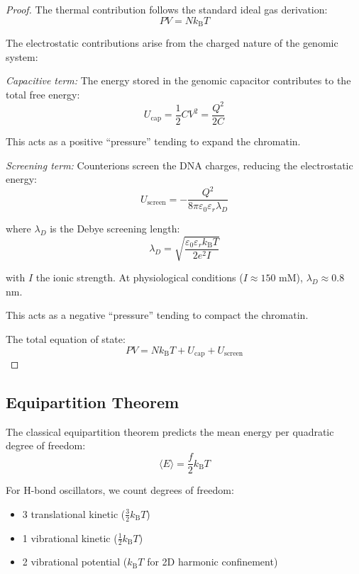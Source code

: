 \documentclass[twocolumn,10pt]{article}
\theoremstyle{remark}
\newcommand{\kB}{k_{\mathrm{B}}}
\begin{document}
\begin{proof}
The thermal contribution follows the standard ideal gas derivation:
\begin{equation}
PV = N\kB T
\end{equation}

The electrostatic contributions arise from the charged nature of the genomic system:

\textit{Capacitive term:} The energy stored in the genomic capacitor contributes to the total free energy:
\begin{equation}
U_{\mathrm{cap}} = \frac{1}{2}CV^2 = \frac{Q^2}{2C}
\end{equation}

This acts as a positive ``pressure'' tending to expand the chromatin.

\textit{Screening term:} Counterions screen the DNA charges, reducing the electrostatic energy:
\begin{equation}
U_{\mathrm{screen}} = -\frac{Q^2}{8\pi\varepsilon_0\varepsilon_r\lambda_D}
\end{equation}

where $\lambda_D$ is the Debye screening length:
\begin{equation}
\lambda_D = \sqrt{\frac{\varepsilon_0\varepsilon_r \kB T}{2e^2 I}}
\end{equation}

with $I$ the ionic strength. At physiological conditions ($I \approx 150$ mM), $\lambda_D \approx 0.8$ nm.

This acts as a negative ``pressure'' tending to compact the chromatin.

The total equation of state:
\begin{equation}
PV = N\kB T + U_{\mathrm{cap}} + U_{\mathrm{screen}}
\end{equation}
\end{proof}

\subsection{Equipartition Theorem}

The classical equipartition theorem predicts the mean energy per quadratic degree of freedom:
\begin{equation}
\langle E \rangle = \frac{f}{2}\kB T
\end{equation}

For H-bond oscillators, we count degrees of freedom:
\begin{itemize}
\item 3 translational kinetic ($\frac{3}{2}\kB T$)
\item 1 vibrational kinetic ($\frac{1}{2}\kB T$)
\item 2 vibrational potential ($\kB T$ for 2D harmonic confinement)
\end{itemize}
\end{document}

